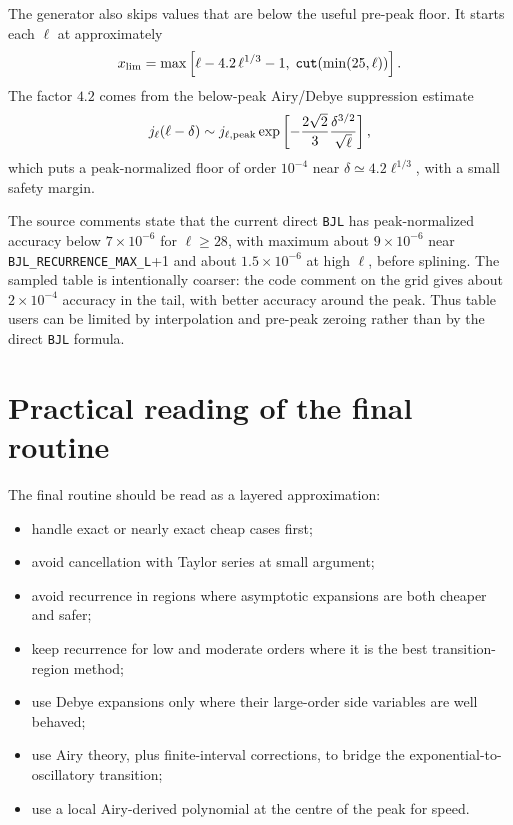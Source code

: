 \documentclass[11pt,a4paper]{article}
\newcommand{\code}[1]{\texttt{#1}}
\begin{document}
The generator also skips values that are below the useful pre-peak floor.  It starts each $\ell$ at approximately
\begin{equation}
  x_{\rm lim}=\max\left[\ell-4.2\,\ell^{1/3}-1,\;\code{cut}(\min(25,\ell))\right].
\end{equation}
The factor $4.2$ comes from the below-peak Airy/Debye suppression estimate
\begin{equation}
  j_\ell(\ell-\delta)\sim j_{\ell,{\rm peak}}
  \exp\left[-\frac{2\sqrt2}{3}\frac{\delta^{3/2}}{\sqrt{\ell}}\right],
\end{equation}
which puts a peak-normalized floor of order $10^{-4}$ near $\delta\simeq4.2\ell^{1/3}$, with a small safety margin.

The source comments state that the current direct \code{BJL} has peak-normalized accuracy below $7\times10^{-6}$ for $\ell\ge28$, with maximum about $9\times10^{-6}$ near \code{BJL\_RECURRENCE\_MAX\_L}+1 and about $1.5\times10^{-6}$ at high $\ell$, before splining.  The sampled table is intentionally coarser: the code comment on the grid gives about $2\times10^{-4}$ accuracy in the tail, with better accuracy around the peak.  Thus table users can be limited by interpolation and pre-peak zeroing rather than by the direct \code{BJL} formula.

\section{Practical reading of the final routine}

The final routine should be read as a layered approximation:
\begin{itemize}[leftmargin=*]
\item handle exact or nearly exact cheap cases first;
\item avoid cancellation with Taylor series at small argument;
\item avoid recurrence in regions where asymptotic expansions are both cheaper and safer;
\item keep recurrence for low and moderate orders where it is the best transition-region method;
\item use Debye expansions only where their large-order side variables are well behaved;
\item use Airy theory, plus finite-interval corrections, to bridge the exponential-to-oscillatory transition;
\item use a local Airy-derived polynomial at the centre of the peak for speed.
\end{itemize}
\end{document}
